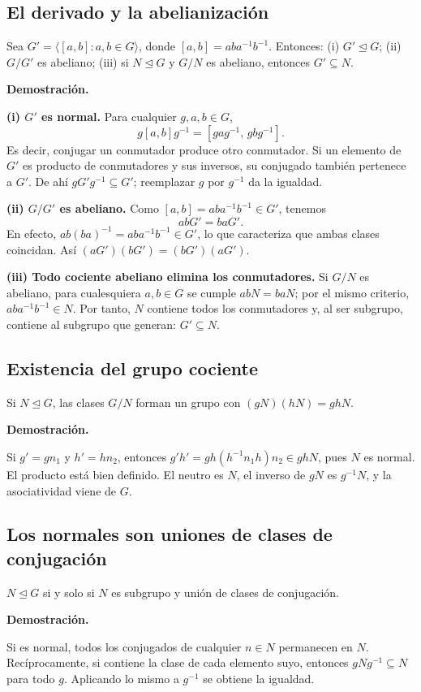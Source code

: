 \documentclass[11pt,a4paper]{article}
\begin{document}
\subsection{El derivado y la abelianización}
\begin{resultado}
Sea $G'=\langle [a,b]:a,b\in G\rangle$, donde $[a,b]=aba^{-1}b^{-1}$. Entonces: (i) $G'\trianglelefteq G$; (ii) $G/G'$ es abeliano; (iii) si $N\trianglelefteq G$ y $G/N$ es abeliano, entonces $G'\subseteq N$.
\end{resultado}
\textbf{Demostración.}
\begin{demostracion}
\textbf{(i) $G'$ es normal.} Para cualquier $g,a,b\in G$,
\[g[a,b]g^{-1}=[gag^{-1},\,gbg^{-1}].\]
Es decir, conjugar un conmutador produce otro conmutador. Si un elemento de $G'$ es producto de conmutadores y sus inversos, su conjugado también pertenece a $G'$. De ahí $gG'g^{-1}\subseteq G'$; reemplazar $g$ por $g^{-1}$ da la igualdad.

\textbf{(ii) $G/G'$ es abeliano.} Como $[a,b]=aba^{-1}b^{-1}\in G'$, tenemos
\[abG'=baG'.\]
En efecto, $ab(ba)^{-1}=aba^{-1}b^{-1}\in G'$, lo que caracteriza que ambas clases coincidan. Así $(aG')(bG')=(bG')(aG')$.

\textbf{(iii) Todo cociente abeliano elimina los conmutadores.} Si $G/N$ es abeliano, para cualesquiera $a,b\in G$ se cumple $abN=baN$; por el mismo criterio, $aba^{-1}b^{-1}\in N$. Por tanto, $N$ contiene todos los conmutadores y, al ser subgrupo, contiene al subgrupo que generan: $G'\subseteq N$.
\end{demostracion}


\subsection{Existencia del grupo cociente}
\begin{resultado}
Si $N\trianglelefteq G$, las clases $G/N$ forman un grupo con $(gN)(hN)=ghN$.
\end{resultado}
\textbf{Demostración.}
\begin{demostracion}
Si $g\prime=gn_1$ y $h\prime=hn_2$, entonces $g\prime h\prime=gh(h^{-1}n_1h)n_2\in ghN$, pues $N$ es normal. El producto está bien definido. El neutro es $N$, el inverso de $gN$ es $g^{-1}N$, y la asociatividad viene de $G$.
\end{demostracion}


\subsection{Los normales son uniones de clases de conjugación}
\begin{resultado}
$N\trianglelefteq G$ si y solo si $N$ es subgrupo y unión de clases de conjugación.
\end{resultado}
\textbf{Demostración.}
\begin{demostracion}
Si es normal, todos los conjugados de cualquier $n\in N$ permanecen en $N$. Recíprocamente, si contiene la clase de cada elemento suyo, entonces $gNg^{-1}\subseteq N$ para todo $g$. Aplicando lo mismo a $g^{-1}$ se obtiene la igualdad.
\end{demostracion}
\end{document}
